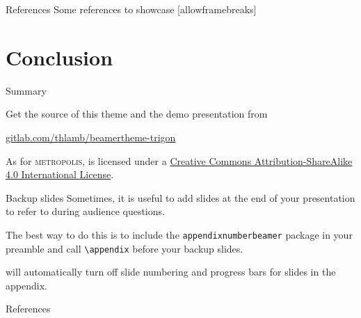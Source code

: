 \begin{frame}{References}
  Some references to showcase [allowframebreaks] \cite{knuth92,ConcreteMath,Simpson,Er01,greenwade93}
\end{frame}

\section{Conclusion}
\begin{frame}{Summary}

  Get the source of this theme and the demo presentation from

  \begin{center}\url{gitlab.com/thlamb/beamertheme-trigon}\end{center}

  As for \textsc{metropolis}, \themename is licensed under a
  \href{http://creativecommons.org/licenses/by-sa/4.0/}{Creative Commons
  Attribution-ShareAlike 4.0 International License}.

  \begin{center}\ccbysa\end{center}

\end{frame}


\appendix

\begin{frame}[fragile]{Backup slides}
  Sometimes, it is useful to add slides at the end of your presentation to
  refer to during audience questions.

  The best way to do this is to include the \verb|appendixnumberbeamer|
  package in your preamble and call \verb|\appendix| before your backup slides.

  \themename will automatically turn off slide numbering and progress bars for
  slides in the appendix.
\end{frame}

\begin{frame}[allowframebreaks]{References}

  
  

\end{frame}
